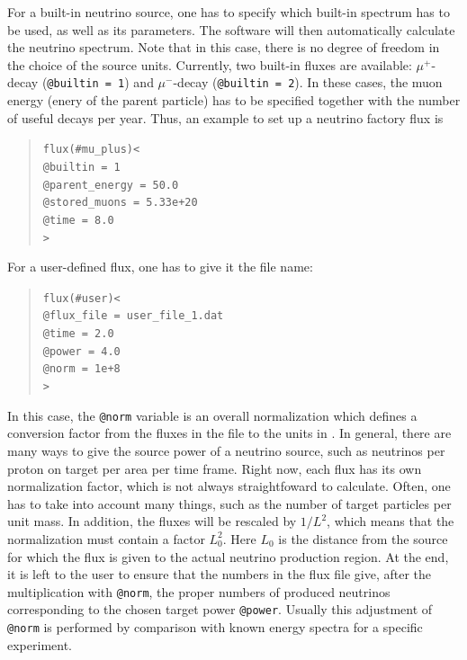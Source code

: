 For a built-in neutrino source, one has to specify which
built-in spectrum has to be used, as well as its parameters. The software
will then automatically calculate the neutrino spectrum. Note that in this
case, there is no degree of freedom in the choice of the source units.
Currently, two built-in fluxes are available: $\mu^+$-decay ({\tt @builtin = 1}) and $\mu^-$-decay ({\tt @builtin = 2}). In these cases, the muon energy (enery of the parent particle) has to be specified together with the number of useful decays  per year. Thus, an example to set up a neutrino factory flux is
\begin{quote}
{\tt flux(\#mu\_plus)<\\
\tb  @builtin = 1\\
\tb  @parent\_energy = 50.0\\
\tb  @stored\_muons = 5.33e+20\\
\tb  @time = 8.0\\
>}
\end{quote}
%
For a user-defined flux, one has to give it the file name:
\begin{quote}
{\tt flux(\#user)<}\\
{\tt \tb @flux\_file = user\_file\_1.dat\\
\tb @time = 2.0\\
\tb @power = 4.0\\
\tb @norm = 1e+8}\\
{\tt >}
\end{quote}
In this case, the {\tt @norm} variable is an overall normalization which defines a conversion factor from the fluxes in the file to the units in \GLOBES . In general, there are many ways to give the source power of a 
neutrino source, such as neutrinos per proton on target per area per time frame. Right now, each flux has its own normalization factor, which is
not always straightfoward to calculate. Often, one has to take into account
many things, such as the number of target particles per unit mass. 
In addition, the fluxes will be rescaled by $1/L^2$, which means that the
normalization must contain a factor $L_0^2$. Here $L_0$ is the distance from the source for which the flux is given to the actual neutrino production region. At the end, it is left to the user to ensure that the 
numbers in the flux file give, after the multiplication with {\tt @norm}, 
the proper numbers of produced neutrinos corresponding to the chosen target power {\tt @power}. Usually this adjustment of {\tt @norm} is performed by comparison with known energy spectra for a specific experiment.

